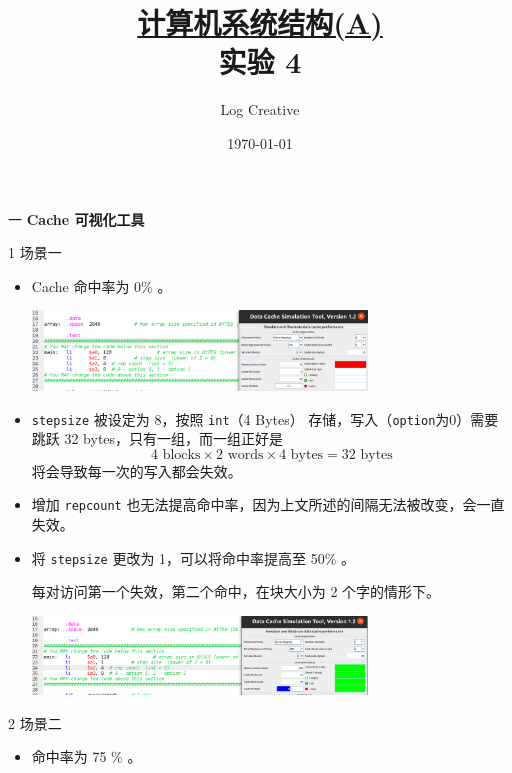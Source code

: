 \documentclass[12pt,a4paper]{article}
\newenvironment{problems}{\begin{list}{}{\renewcommand{\makelabel}[1]{\textbf{##1}.\hfil}}}{\end{list}}
\newenvironment{steps}{\begin{list}{}{\renewcommand{\makelabel}[1]{(##1)\hfil}}}{\end{list}}
\begin{document}
\title{\normalsize \underline{计算机系统结构(A)}\\\LARGE 实验 4}
\author{Log Creative }
\date{\today}
\maketitle

\begin{problems}
    \item[一] \textbf{Cache 可视化工具}
    
    \begin{steps}
        \item[1] 场景一
        
        \begin{itemize}
            \item Cache 命中率为 0\% 。
            
            \includegraphics[width=0.7\textwidth]{cache1.png}
            \item \verb"stepsize" 被设定为 8，按照 \verb"int"（4 Bytes） 存储，写入（\verb"option"为0）需要跳跃 32 bytes，只有一组，而一组正好是
            \begin{equation*}
                4\text{ blocks}\times 2\text{ words}\times 4\text{ bytes} = 32 \text{ bytes}
            \end{equation*}
            将会导致每一次的写入都会失效。
            \item 增加 \verb"repcount" 也无法提高命中率，因为上文所述的间隔无法被改变，会一直失效。
            \item 将 \verb"stepsize" 更改为 1，可以将命中率提高至 50\% 。
            
            每对访问第一个失效，第二个命中，在块大小为 2 个字的情形下。

            \includegraphics[width=0.7\textwidth]{cache1o.png}
        \end{itemize}

        \item[2] 场景二
        \begin{itemize}
            \item 命中率为 75 \% 。
            

\end{itemize}
\end{steps}
\end{problems}
\end{document}
